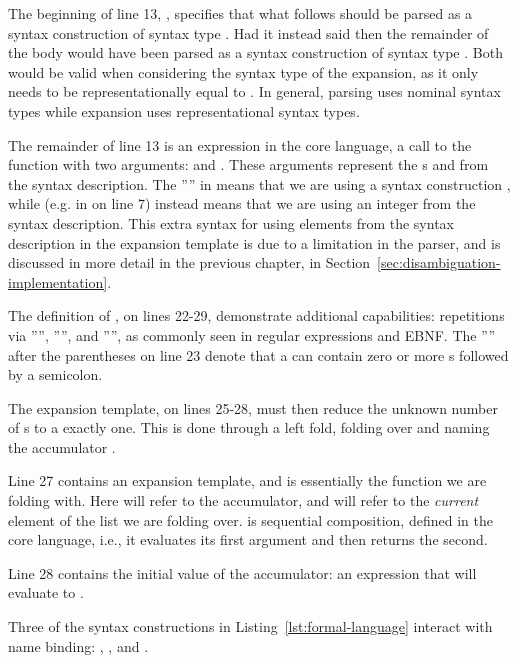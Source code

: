 \documentclass{kththesis}
\begin{document}
The beginning of line 13, , specifies that what follows should be parsed as a syntax construction of syntax type . Had it instead said  then the remainder of the body would have been parsed as a syntax construction of syntax type . Both would be valid when considering the syntax type of the expansion, as it only needs to be representationally equal to . In general, parsing uses nominal syntax types while expansion uses representational syntax types.

The remainder of line 13 is an expression in the core language, a call to the function  with two arguments:  and . These arguments represent the s  and  from the syntax description. The '''' in  means that we are using a syntax construction , while  (e.g. in  on line 7) instead means that we are using an integer from the syntax description. This extra syntax for using elements from the syntax description in the expansion template is due to a limitation in the parser, and is discussed in more detail in the previous chapter, in Section~\ref{sec:disambiguation-implementation}.

The definition of , on lines 22-29, demonstrate additional capabilities: repetitions via ''\syncon{*}'', ''\syncon{+}'', and '''', as commonly seen in regular expressions and EBNF. The ''\syncon{*}'' after the parentheses on line 23 denote that a  can contain zero or more s followed by a semicolon.

The expansion template, on lines 25-28, must then reduce the unknown number of s to a exactly one. This is done through a left fold, folding over  and naming the accumulator .

Line 27 contains an expansion template, and is essentially the function we are folding with. Here  will refer to the accumulator, and  will refer to the \emph{current} element of the list we are folding over.  is sequential composition, defined in the core language, i.e., it evaluates its first argument and then returns the second.

Line 28 contains the initial value of the accumulator: an expression that will evaluate to .

Three of the syntax constructions in Listing~\ref{lst:formal-language} interact with name binding: , , and .
\end{document}
